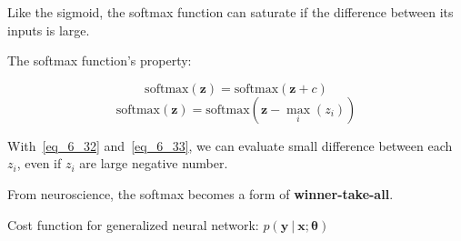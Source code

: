   Like the sigmoid, the softmax function can saturate if the difference between its inputs is large.

  The softmax function's property:

  \begin{equation} \tag{6.32}
    \label{eq_6_32}
    \mathrm{softmax}( \bm{z} ) = \mathrm{softmax}( \bm{z} + c )
  \end{equation}
  \begin{equation} \tag{6.33}
    \label{eq_6_33}
    \mathrm{softmax}( \bm{z} ) = \mathrm{softmax}( \bm{z} - \max _ i (z _ i) )
  \end{equation}

  With~\eqref{eq_6_32} and~\eqref{eq_6_33}, we can evaluate small difference between each $z _ i$, even if $z _ i$ are large negative number.

  From neuroscience, the softmax becomes a form of \textbf{winner-take-all}.


  Cost function for generalized neural network:
  $p( \bm{y} \ |\ \bm{x};\bm{\theta} )$

